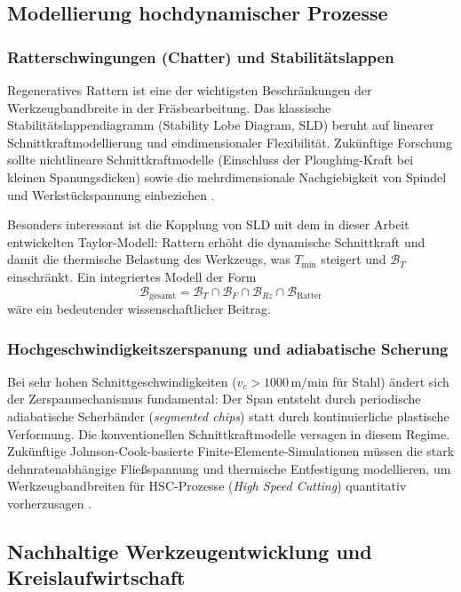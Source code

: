 ﻿\documentclass[a4paper,12pt]{article}
\theoremstyle{definition}
\begin{document}
\subsection{Modellierung hochdynamischer Prozesse}

\subsubsection{Ratterschwingungen (Chatter) und Stabilitätslappen}

Regeneratives Rattern ist eine der wichtigsten Beschränkungen der
Werkzeugbandbreite in der Fräsbearbeitung. Das klassische Stabilitätslappendiagramm
(Stability Lobe Diagram, SLD) beruht auf linearer Schnittkraftmodellierung
und eindimensionaler Flexibilität. Zukünftige Forschung sollte nichtlineare
Schnittkraftmodelle (Einschluss der Ploughing-Kraft bei kleinen Spanungsdicken)
sowie die mehrdimensionale Nachgiebigkeit von Spindel und Werkstückspannung
einbeziehen \cite{altintas2012}.

Besonders interessant ist die Kopplung von SLD mit dem in dieser Arbeit
entwickelten Taylor-Modell: Rattern erhöht die dynamische Schnittkraft und
damit die thermische Belastung des Werkzeugs, was $T_{\min}$ steigert und
$\mathcal{B}_T$ einschränkt. Ein integriertes Modell der Form
\[
  \mathcal{B}_{\text{gesamt}} = \mathcal{B}_T \cap \mathcal{B}_F \cap \mathcal{B}_{Rz}
  \cap \mathcal{B}_{\text{Ratter}}
\]
wäre ein bedeutender wissenschaftlicher Beitrag.

\subsubsection{Hochgeschwindigkeitszerspanung und adiabatische Scherung}

Bei sehr hohen Schnittgeschwindigkeiten ($v_c > 1000\,\mathrm{m/min}$
für Stahl) ändert sich der Zerspanmechanismus fundamental: Der Span entsteht
durch periodische adiabatische Scherbänder (\emph{segmented chips}) statt
durch kontinuierliche plastische Verformung. Die konventionellen
Schnittkraftmodelle versagen in diesem Regime. Zukünftige
Johnson-Cook-basierte Finite-Elemente-Simulationen müssen die stark
dehnratenabhängige Fließspannung und thermische Entfestigung modellieren,
um Werkzeugbandbreiten für HSC-Prozesse (\emph{High Speed Cutting})
quantitativ vorherzusagen \cite{johnson1985}.

\subsection{Nachhaltige Werkzeugentwicklung und Kreislaufwirtschaft}
\end{document}

